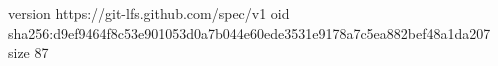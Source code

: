 version https://git-lfs.github.com/spec/v1
oid sha256:d9ef9464f8c53e901053d0a7b044e60ede3531e9178a7c5ea882bef48a1da207
size 87
